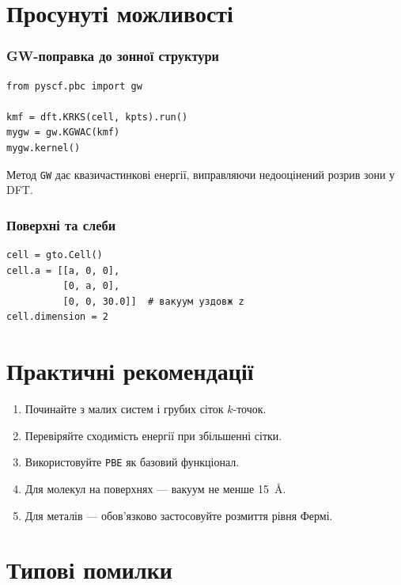 \section{Просунуті можливості}

\subsubsection{GW-поправка до зонної структури}

\begin{verbatim}
from pyscf.pbc import gw

kmf = dft.KRKS(cell, kpts).run()
mygw = gw.KGWAC(kmf)
mygw.kernel()
\end{verbatim}

Метод \texttt{GW} дає квазичастинкові енергії, виправляючи недооцінений розрив зони у DFT.

\subsubsection{Поверхні та слеби}

\begin{verbatim}
cell = gto.Cell()
cell.a = [[a, 0, 0],
          [0, a, 0],
          [0, 0, 30.0]]  # вакуум уздовж z
cell.dimension = 2
\end{verbatim}

\section{Практичні рекомендації}

\begin{enumerate}
    \item Починайте з малих систем і грубих сіток $k$-точок.
    \item Перевіряйте сходимість енергії при збільшенні сітки.
    \item Використовуйте \texttt{PBE} як базовий функціонал.
    \item Для молекул на поверхнях --- вакуум не менше 15~Å.
    \item Для металів --- обов’язково застосовуйте розмиття рівня Фермі.
\end{enumerate}

\section{Типові помилки}

